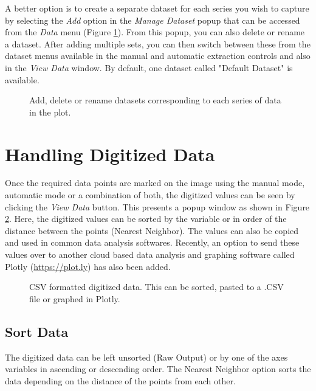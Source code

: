 \documentclass[letterpaper, 11pt]{article}
\begin{document}
A better option is to create a separate dataset for each series you wish to capture by selecting the \emph{Add} option in the \emph{Manage Dataset} popup that can be accessed from the \emph{Data} menu (Figure \ref{fig:manageDatasets}). From this popup, you can also delete or rename a dataset. After adding multiple sets, you can then switch between these from the dataset menus available in the manual and automatic extraction controls and also in the \emph{View Data} window. By default, one dataset called "Default Dataset" is available.
\begin{figure}[h]
\begin{center}
\caption{Add, delete or rename datasets corresponding to each series of data in the plot.}
\label{fig:manageDatasets}
\end{center}
\end{figure}

 
\section{Handling Digitized Data}
\label{sec:csvData}
Once the required data points are marked on the image using the manual mode, automatic mode or a combination of both, the digitized values can be seen by clicking the \emph{View Data} button. This presents a popup window as shown in Figure \ref{fig:csvOutput}. Here, the digitized values can be sorted by the variable or in order of the distance between the points (Nearest Neighbor). The values can also be copied and used in common data analysis softwares. Recently, an option to send these values over to another cloud based data analysis and graphing software called Plotly (\url{https://plot.ly}) has also been added.
 
\begin{figure}
\begin{center}
\caption{CSV formatted digitized data. This can be sorted, pasted to a .CSV file or graphed in Plotly.}
\label{fig:csvOutput}
\end{center}
\end{figure}
\subsection{Sort Data}
The digitized data can be left unsorted (Raw Output) or by one of the axes variables in ascending or descending order. The Nearest Neighbor option sorts the data depending on the distance of the points from each other.
\end{document}
